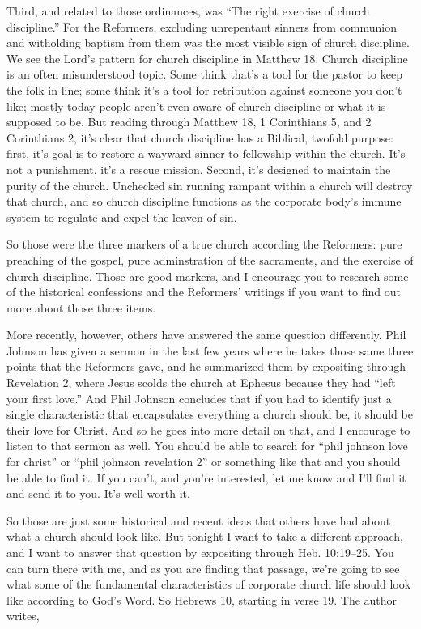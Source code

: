 \documentclass[letterpaper, 12pt]{article}
\begin{document}
    Third, and related to those ordinances, was ``The right exercise of
    church discipline.'' For the Reformers, excluding unrepentant
    sinners from communion and witholding baptism from them was the most
    visible sign of church discipline. We see the Lord's pattern for
    church discipline in Matthew 18. Church discipline is an often
    misunderstood topic. Some think that's a tool for the pastor to keep
    the folk in line; some think it's a tool for retribution against
    someone you don't like; mostly today people aren't even aware of
    church discipline or what it is supposed to be.  But reading through
    Matthew 18, 1 Corinthians 5, and 2 Corinthians 2, it's clear that
    church discipline has a Biblical, twofold purpose: first, it's goal
    is to restore a wayward sinner to fellowship within the church. It's
    not a punishment, it's a rescue mission. Second, it's designed to
    maintain the purity of the church.  Unchecked sin running rampant
    within a church will destroy that church, and so church discipline
    functions as the corporate body's immune system to regulate and
    expel the leaven of sin.

    So those were the three markers of a true church according the
    Reformers: pure preaching of the gospel, pure adminstration of the
    sacraments, and the exercise of church discipline. Those are good
    markers, and I encourage you to research some of the historical
    confessions and the Reformers' writings if you want to find out more
    about those three items.

    More recently, however, others have answered the same question
    differently. Phil Johnson has given a sermon in the last few years
    where he takes those same three points that the Reformers gave, and
    he summarized them by expositing through Revelation 2, where Jesus
    scolds the church at Ephesus because they had ``left your first
    love.'' And Phil Johnson concludes that if you had to identify just
    a single characteristic that encapsulates everything a church should
    be, it should be their love for Christ. And so he goes into more
    detail on that, and I encourage to listen to that sermon as well.
    You should be able to search for ``phil johnson love for christ'' or
    ``phil johnson revelation 2'' or something like that and you should
    be able to find it. If you can't, and you're interested, let me know
    and I'll find it and send it to you. It's well worth it.

    So those are just some historical and recent ideas that others have
    had about what a church should look like. But tonight I want to take
    a different approach, and I want to answer that question by
    expositing through Heb. 10:19--25. You can turn there with me, and
    as you are finding that passage, we're going to see what some of the
    fundamental characteristics of corporate church life should look
    like according to God's Word. So Hebrews 10, starting in verse 19.
    The author writes,
\end{document}
